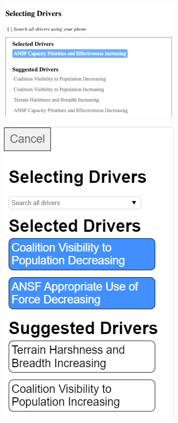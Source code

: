 \begin{figure}
\centering
    \begin{subfigure}[b]{.55\linewidth}
        \includegraphics[width=\linewidth]{chapters/04_muifold/figures/driver_select_screen.png}
    \end{subfigure}
    \begin{subfigure}[b]{.2\linewidth}
        \includegraphics[width=\linewidth]{chapters/04_muifold/figures/driver_select_muifold.png}

\end{subfigure}
\end{figure}
